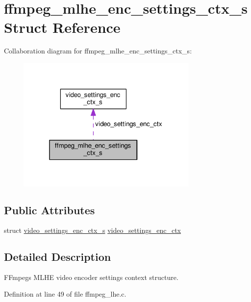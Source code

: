 \hypertarget{structffmpeg__mlhe__enc__settings__ctx__s}{}\section{ffmpeg\+\_\+mlhe\+\_\+enc\+\_\+settings\+\_\+ctx\+\_\+s Struct Reference}
\label{structffmpeg__mlhe__enc__settings__ctx__s}


Collaboration diagram for ffmpeg\+\_\+mlhe\+\_\+enc\+\_\+settings\+\_\+ctx\+\_\+s\+:\nopagebreak
\begin{figure}[H]
\begin{center}
\leavevmode
\includegraphics[width=253pt]{structffmpeg__mlhe__enc__settings__ctx__s__coll__graph}
\end{center}
\end{figure}
\subsection*{Public Attributes}
\begin{DoxyCompactItemize}
\item 
struct \hyperlink{structvideo__settings__enc__ctx__s}{video\+\_\+settings\+\_\+enc\+\_\+ctx\+\_\+s} \hyperlink{structffmpeg__mlhe__enc__settings__ctx__s_a683893565bbe4cfec2a3ae10fc7aeb3c}{video\+\_\+settings\+\_\+enc\+\_\+ctx}
\end{DoxyCompactItemize}


\subsection{Detailed Description}
F\+Fmpeg\textquotesingle{}s M\+L\+HE video encoder settings context structure. 

Definition at line 49 of file ffmpeg\+\_\+lhe.\+c.



